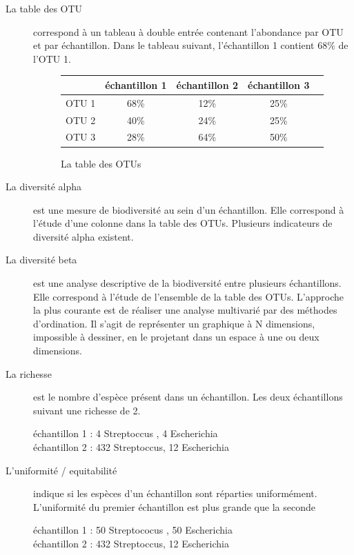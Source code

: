 \documentclass[12pt,a4paper]{article}
\begin{document}
\begin{description}
\item[La table des OTU] correspond à un tableau à double entrée contenant l’abondance par OTU  et par échantillon. Dans le tableau suivant, l'échantillon 1 contient 68\% de l'OTU 1.

\begin{figure}
\begin{center}
\begin{tabular}{|l|c|c|c|c}
  \hline
   & échantillon 1 & échantillon 2 & échantillon 3  \\
  \hline
  OTU 1 & 68\% & 12\% & 25\% \\
  OTU 2 & 40\% & 24\% & 25\% \\
  OTU 3 & 28\% & 64\% & 50\% \\

  \hline
\end{tabular}
\end{center}
\caption{La table des OTUs}
\end{figure}

\item[La diversité alpha] est une mesure de biodiversité au sein d’un échantillon. Elle correspond à l’étude d’une colonne dans la table des OTUs. Plusieurs indicateurs de diversité alpha existent.

\item[La diversité beta] est une analyse descriptive de la biodiversité entre plusieurs échantillons. Elle correspond à l’étude de l’ensemble de la table des OTUs. L’approche la plus courante est de réaliser une analyse multivarié par des méthodes d’ordination. Il s’agit de représenter un graphique à N dimensions, impossible à dessiner, en le projetant dans un espace à une ou deux dimensions.

\item[La richesse] est le nombre d’espèce présent dans un échantillon. Les deux échantillons suivant une richesse de 2.

échantillon 1  : 4 Streptoccus , 4 Escherichia  \\ 
échantillon 2 : 432 Streptoccus, 12 Escherichia 

\item[L'uniformité / equitabilité] indique si les espèces d’un échantillon sont réparties uniformément.
L'uniformité du premier échantillon est plus grande que la seconde

échantillon 1  : 50 Streptococus , 50 Escherichia  \\ 
échantillon 2 : 432 Streptoccus, 12 Escherichia 



\end{description}
\end{document}
